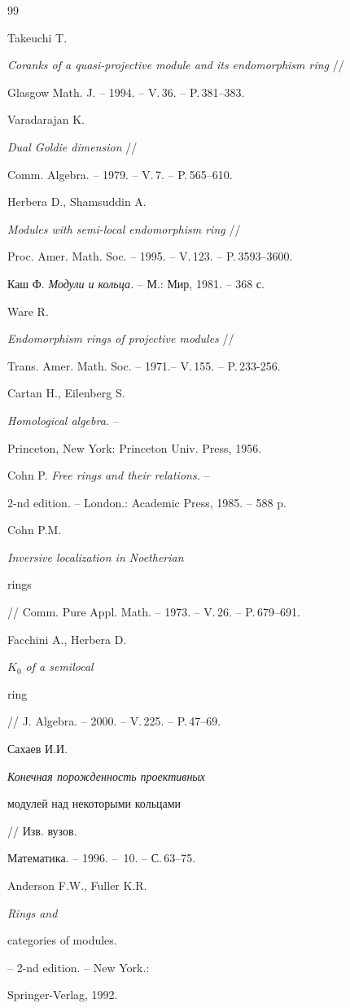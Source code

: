 \begin{thebibliography}{99}


Takeuchi T.


{\em Coranks of a quasi-projective module and its endomorphism ring} // 


Glasgow Math. J. -- 1994. -- V.\,36. -- P.\,381--383. 




Varadarajan K.


{\em Dual Goldie dimension} // 


Comm. Algebra. -- 1979. -- V.\,7. -- P.\,565--610. 




Herbera D., Shamsuddin A.


{\em Modules with semi-local endomorphism ring} // 


Proc. Amer. Math. Soc. -- 1995. -- V.\,123. -- P.\,3593--3600. 




Каш Ф. {\em Модули и кольца.} -- М.: Мир, 1981. -- 368 с.




Ware R. 


{\em Endomorphism rings of projective modules} //


Trans. Amer. Math. Soc. -- 1971.-- V.\,155. -- P.\,233-256.




Cartan H., Eilenberg S.


{\em Homological algebra.} -- 


Princeton, New York: Princeton Univ. Press, 1956.




Cohn P. {\em Free rings and their relations.} -- 


2-nd edition. -- London.: Academic Press, 1985. -- 588 p.




Cohn P.M. {\em Inversive localization in Noetherian


rings} // Comm. Pure Appl. Math. -- 1973. -- V.\,26. -- P.\,679--691.




Facchini A., Herbera D. {\em $K_0$ of a semilocal


ring} // J. Algebra. -- 2000. -- V.\,225. -- P.\,47--69.




Сахаев И.И. {\em Конечная порожденность проективных


модулей над некоторыми кольцами} // Изв. вузов. 


Математика. -- 1996. -- \No\,10. -- С.\,63--75.




Anderson F.W., Fuller K.R. {\em Rings and


categories of modules.} -- 2-nd edition. -- New York.:


Springer-Verlag, 1992.





\end{thebibliography}






